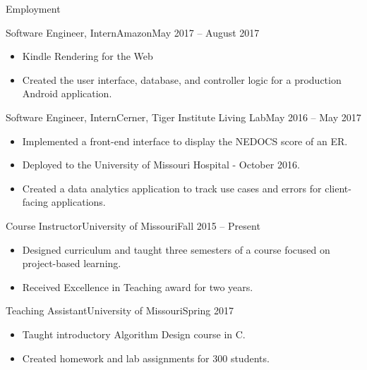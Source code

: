 \documentclass[]{mcdowellcv}
\begin{document}
    \begin{cvsection}{Employment}
        \begin{cvsubsection}{Software Engineer, Intern}{Amazon}{May 2017 -- August 2017}
            \begin{itemize}
            \item Kindle Rendering for the Web
            \item Created the user interface, database, and controller logic for a production Android application.
            \end{itemize}
        \end{cvsubsection}

        \begin{cvsubsection}{Software Engineer, Intern}{Cerner, Tiger Institute Living Lab}{May 2016 -- May 2017}		
            \begin{itemize}
                \item Implemented a front-end interface to display the NEDOCS score of an ER.
                \item Deployed to the University of Missouri Hospital - October 2016.
                \item Created a data analytics application to track use cases and errors for client-facing applications.
            \end{itemize}
        \end{cvsubsection}

        \begin{cvsubsection}{Course Instructor}{University of Missouri}{Fall 2015 -- Present}
            \begin{itemize}
                \item Designed curriculum and taught three semesters of a course focused on project-based learning.
                \item Received Excellence in Teaching award for two years.
            \end{itemize}
        \end{cvsubsection}
        
        \begin{cvsubsection}{Teaching Assistant}{University of Missouri}{Spring 2017}
            \begin{itemize}
                \item Taught introductory Algorithm Design course in C.
                \item Created homework and lab assignments for 300 students.
            \end{itemize}
        \end{cvsubsection}

    \end{cvsection}	
    
\end{document}
